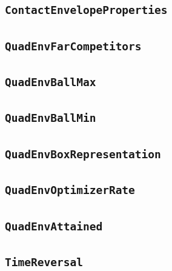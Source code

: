 \documentclass[11pt]{amsart}
\theoremstyle{definition}
\begin{document}
\subsection{\texorpdfstring{\texttt{ContactEnvelopeProperties}}{ContactEnvelopeProperties}}\label{node:ContactEnvelopeProperties}


\subsection{\texorpdfstring{\texttt{QuadEnvFarCompetitors}}{QuadEnvFarCompetitors}}\label{node:QuadEnvFarCompetitors}


\subsection{\texorpdfstring{\texttt{QuadEnvBallMax}}{QuadEnvBallMax}}\label{node:QuadEnvBallMax}


\subsection{\texorpdfstring{\texttt{QuadEnvBallMin}}{QuadEnvBallMin}}\label{node:QuadEnvBallMin}


\subsection{\texorpdfstring{\texttt{QuadEnvBoxRepresentation}}{QuadEnvBoxRepresentation}}\label{node:QuadEnvBoxRepresentation}


\subsection{\texorpdfstring{\texttt{QuadEnvOptimizerRate}}{QuadEnvOptimizerRate}}\label{node:QuadEnvOptimizerRate}


\subsection{\texorpdfstring{\texttt{QuadEnvAttained}}{QuadEnvAttained}}\label{node:QuadEnvAttained}


\subsection{\texorpdfstring{\texttt{TimeReversal}}{TimeReversal}}\label{node:TimeReversal}

\end{document}
